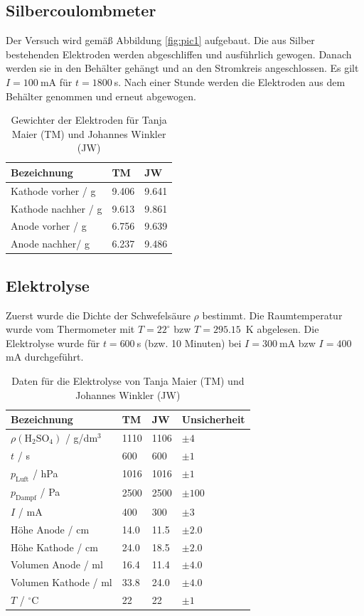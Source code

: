 \documentclass{article}
\begin{document}
\subsection{Silbercoulombmeter}
Der Versuch wird gemäß Abbildung \ref{fig:pic1} aufgebaut. Die aus Silber bestehenden Elektroden werden abgeschliffen und ausführlich gewogen. Danach werden sie in den Behälter gehängt und an den Stromkreis angeschlossen. Es gilt $I=100~$mA für $t=1800~$s. Nach einer Stunde werden die Elektroden aus dem Behälter genommen und erneut abgewogen.

\begin{table}[H]
\caption{Gewichter der Elektroden für Tanja Maier (TM) und Johannes Winkler (JW)}

\begin{tabular}{l|ll}
Bezeichnung & TM & JW \\
\hline
Kathode vorher / g & 9.406 & 9.641 \\
Kathode nachher / g & 9.613 & 9.861 \\
Anode vorher / g & 6.756 & 9.639  \\
Anode nachher/ g & 6.237 & 9.486 \\
\end{tabular}

\end{table}



\subsection{Elektrolyse}
Zuerst wurde die Dichte der Schwefelsäure $\rho$ bestimmt. Die Raumtemperatur wurde vom Thermometer mit $T=22^\circ$ bzw $T=295.15$~K abgelesen. Die Elektrolyse wurde für $t=600~$s (bzw. 10 Minuten) bei $I=300~$mA bzw $I=400~$mA durchgeführt.


\begin{table}[H]
\caption{Daten für die Elektrolyse von Tanja Maier (TM) und Johannes Winkler (JW)}

\begin{tabular}{l|lll}
Bezeichnung & TM & JW & Unsicherheit \\
\hline
$\rho({\text{H}_2\text{SO}_4})$ / g/dm${}^3$ & 1110 & 1106 & $\pm 4$ \\
$t$ / s & 600 & 600 & $\pm 1$ \\
$p_{\text{Luft}}$ / hPa & 1016 & 1016 & $\pm 1$ \\
$p_{\text{Dampf}}$ / Pa & 2500 & 2500 & $\pm 100$ \\
$I$ / mA & 400 & 300 & $\pm 3$ \\
Höhe Anode / cm & 14.0 & 11.5 & $\pm 2.0$ \\
Höhe Kathode / cm & 24.0 & 18.5 & $\pm 2.0$ \\
Volumen Anode / ml & 16.4 & 11.4 & $\pm 4.0$ \\
Volumen Kathode / ml & 33.8 & 24.0 & $\pm 4.0$ \\
$T$ / ${}^\circ$C & 22 & 22 & $\pm 1$
\end{tabular}

\end{table}
\end{document}
